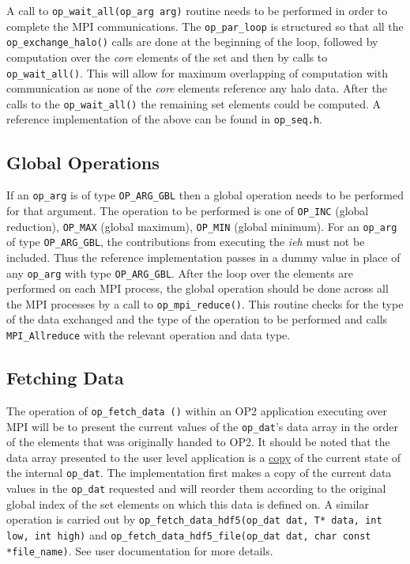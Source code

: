 \documentclass[11pt]{article}
\begin{document}
\noindent A call to \texttt{op\_wait\_all(op\_arg arg)} routine needs to be performed in order to complete the MPI
communications. The \texttt{op\_par\_loop} is structured so that all the \texttt{op\_exchange\_halo()} calls are done at
the beginning of the loop, followed by computation over the \textit{core} elements of the set and then by calls to
\texttt{op\_wait\_all()}. This will allow for maximum overlapping of computation with communication as none of the
\textit{core} elements reference any halo data. After the calls to the \texttt{op\_wait\_all()} the remaining set
elements could be computed. A reference implementation of the above can be found in \texttt{op\_seq.h}.

\subsection{Global Operations}\label{subsec/globalops}

If an \texttt{op\_arg} is of type \texttt{OP\_ARG\_GBL} then a global operation needs to be performed for that argument.
The operation to be performed is one of \texttt{OP\_INC} (global reduction), \texttt{OP\_MAX} (global maximum),
\texttt{OP\_MIN} (global minimum). For an \texttt{op\_arg} of type \texttt{OP\_ARG\_GBL}, the contributions from
executing the \textit{ieh} must not be included. Thus the reference implementation passes in a dummy value in place of
any \texttt{op\_arg} with type \texttt{OP\_ARG\_GBL}. After the loop over the elements are performed on each MPI
process, the global operation should be done across all the MPI processes by a call to \texttt{op\_mpi\_reduce()}. This
routine checks for the type of the data exchanged and the type of the operation to be performed and calls
\texttt{MPI\_Allreduce} with the relevant operation and data type.

\subsection{Fetching Data}\label{subsec/putfetch}
The operation of \texttt{op\_fetch\_data ()} within an OP2 application executing over MPI will be to present the current
values of the \texttt{op\_dat}'s data array in the order of the elements that was originally handed to OP2. It should be
noted that the data array presented to the user level application is a \underline{copy} of the current state of the
internal \texttt{op\_dat}. The implementation first makes a copy of the current data values in the \texttt{op\_dat}
requested and will reorder them according to the original global index of the set elements on which this data is defined
on. A similar operation is carried out by \texttt{op\_fetch\_data\_hdf5(op\_dat dat, T* data, int low, int high)} and
\texttt{op\_fetch\_data\_hdf5\_file(op\_dat dat, char const *file\_name)}. See user documentation for more details. \\
\end{document}
